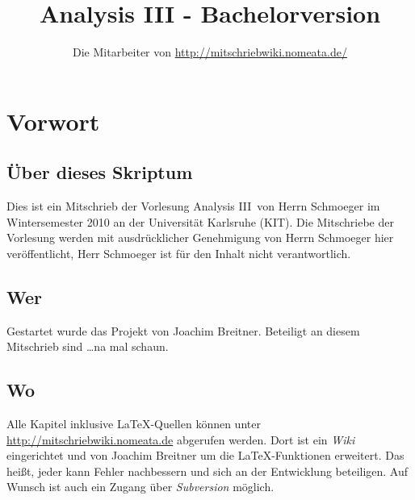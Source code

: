 \documentclass[a4paper,twoside,DIV15,BCOR12mm,chapterprefix=true,headings=onelinechapter]{scrbook}
\author{Die Mitarbeiter von \url{http://mitschriebwiki.nomeata.de/}}
\title{Analysis III - Bachelorversion}
\begin{document}
\maketitle

\renewcommand{\thechapter}{\Roman{chapter}}
\tableofcontents

\chapter{Vorwort}

\section{Über dieses Skriptum}
Dies ist ein Mitschrieb der Vorlesung \glqq Analysis III\grqq\ von Herrn Schmoeger im
Wintersemester 2010 an der Universität Karlsruhe (KIT). Die Mitschriebe der Vorlesung werden mit ausdrücklicher Genehmigung 
von Herrn Schmoeger hier veröffentlicht, Herr Schmoeger ist für den Inhalt nicht 
verantwortlich.

\section{Wer}
Gestartet wurde das Projekt von Joachim Breitner. Beteiligt an diesem Mitschrieb sind \ldots na mal schaun.

\section{Wo}
Alle Kapitel inklusive \LaTeX-Quellen können unter \url{http://mitschriebwiki.nomeata.de} abgerufen werden.
Dort ist ein \emph{Wiki} eingerichtet und von Joachim Breitner um die \LaTeX-Funktionen erweitert.
Das heißt, jeder kann Fehler nachbessern und sich an der Entwicklung
beteiligen. Auf Wunsch ist auch ein Zugang über \emph{Subversion} möglich.


\renewcommand{\thechapter}{\arabic{chapter}}
\renewcommand{\chaptername}{§}
\renewcommand*{\chapterformat}{§\,\thechapter \enskip}
\setcounter{chapter}{-1}
\end{document}
